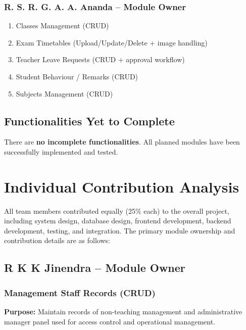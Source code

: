 \documentclass[12pt, a4paper]{report}
\begin{document}
\subsection{R. S. R. G. A. A. Ananda -- Module Owner}
\begin{enumerate}
    \item Classes Management (CRUD)
    \item Exam Timetables (Upload/Update/Delete + image handling)
    \item Teacher Leave Requests (CRUD + approval workflow)
    \item Student Behaviour / Remarks (CRUD)
    \item Subjects Management (CRUD)
\end{enumerate}

\section{Functionalities Yet to Complete}

There are \textbf{no incomplete functionalities}. All planned modules have been successfully implemented and tested.

\chapter{Individual Contribution Analysis}

All team members contributed equally (25\% each) to the overall project, including system design, database design, frontend development, backend development, testing, and integration. The primary module ownership and contribution details are as follows:

\section{R K K Jinendra -- Module Owner}

\subsection{Management Staff Records (CRUD)}
\textbf{Purpose:} Maintain records of non-teaching management and administrative manager panel used for access control and operational management.
\end{document}

